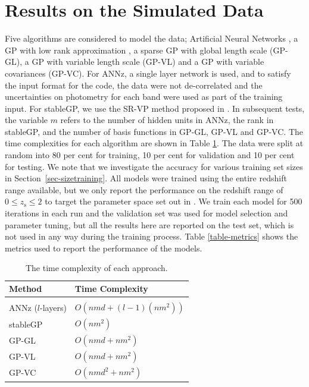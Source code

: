 \documentclass[useAMS,usenatbib,fleqn]{mn2e}
\begin{document}
\section{Results on the Simulated Data}
\label{sec-experiments}

Five algorithms are considered to model the data; Artificial Neural Networks \citep[{\sc ANNz};][]{Collister04}, a GP with low rank approximation \citep[{\sc stableGP};][]{foster2009}, a sparse GP with global length scale (GP-GL), a GP with variable length scale (GP-VL) and a GP with variable covariances (GP-VC). For {\sc ANNz}, a single layer network is used, and to satisfy the input format for the code, the data were not de-correlated and the uncertainties on photometry for each band were used as part of the training input. For {\sc stableGP}, we use the SR-VP method proposed in \citet{foster2009}. In subsequent tests, the variable $m$ refers to the number of hidden units in {\sc ANNz}, the rank in {\sc stableGP}, and the number of basis functions in GP-GL, GP-VL and GP-VC. The time complexities for each algorithm are shown in Table \ref{table-time-complexity}. The data were split at random into 80 per cent for training, 10 per cent for validation and 10 per cent for testing. We note that we investigate the accuracy for various training set sizes in Section~\ref{sec-sizetraining}. All models were trained using the entire redshift range available, but we only report the performance on the redshift range of $0 \le z_\textrm{s} \le 2$ to target the parameter space set out in \cite{laureijs2011}. We train each model for 500 iterations in each run and the validation set was used for model selection and parameter tuning, but all the results here are reported on the test set, which is not used in any way during the training process. Table \ref{table-metrics} shows the metrics used to report the performance of the models.

\begin{table}
\caption{The time complexity of each approach.}
\begin{center}
  \begin{tabular}{| l | l |}
     	Method		&	Time Complexity					\\	\hline				\\
	{\sc ANNz} ($l$-layers)			&	$O\left(nmd+(l-1)(nm^{2})\right)$					\\
	{\sc stableGP}		&	$O\left(nm^{2}\right)$				\\
	GP-GL		&	$O\left(nmd+nm^{2}\right)$		\\	
	GP-VL		&	$O\left(nmd+nm^{2}\right)$		\\	
	GP-VC		&	$O\left(nmd^{2}+nm^{2}\right)$	\\	\hline
  \end{tabular}
\end{center}
\label{table-time-complexity}
\end{table}
\end{document}
